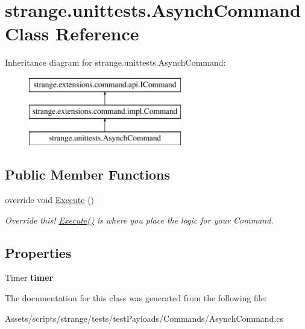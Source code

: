\hypertarget{classstrange_1_1unittests_1_1_asynch_command}{\section{strange.\-unittests.\-Asynch\-Command Class Reference}
\label{classstrange_1_1unittests_1_1_asynch_command}
}
Inheritance diagram for strange.\-unittests.\-Asynch\-Command\-:\begin{figure}[H]
\begin{center}
\leavevmode
\includegraphics[height=3.000000cm]{classstrange_1_1unittests_1_1_asynch_command}
\end{center}
\end{figure}
\subsection*{Public Member Functions}
\begin{DoxyCompactItemize}
\item 
\hypertarget{classstrange_1_1unittests_1_1_asynch_command_aba70ea0350c53e0ffba4e4da8268ccf0}{override void \hyperlink{classstrange_1_1unittests_1_1_asynch_command_aba70ea0350c53e0ffba4e4da8268ccf0}{Execute} ()}\label{classstrange_1_1unittests_1_1_asynch_command_aba70ea0350c53e0ffba4e4da8268ccf0}

\begin{DoxyCompactList}\small\item\em Override this! {\ttfamily \hyperlink{classstrange_1_1unittests_1_1_asynch_command_aba70ea0350c53e0ffba4e4da8268ccf0}{Execute()}} is where you place the logic for your Command. \end{DoxyCompactList}\end{DoxyCompactItemize}
\subsection*{Properties}
\begin{DoxyCompactItemize}
\item 
\hypertarget{classstrange_1_1unittests_1_1_asynch_command_af7fb460898aa8a3ba3af3313892cdcd0}{Timer {\bfseries timer}}\label{classstrange_1_1unittests_1_1_asynch_command_af7fb460898aa8a3ba3af3313892cdcd0}

\end{DoxyCompactItemize}


The documentation for this class was generated from the following file\-:\begin{DoxyCompactItemize}
\item 
Assets/scripts/strange/tests/test\-Payloads/\-Commands/Asynch\-Command.\-cs\end{DoxyCompactItemize}
